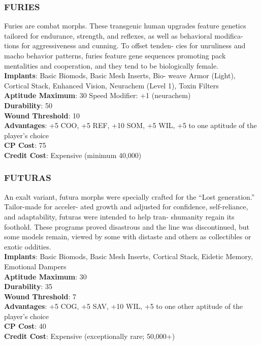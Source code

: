 \subsubsection{FURIES}
Furies are combat morphs. These transgenic human
upgrades feature genetics tailored for endurance,
strength, and reflexes, as well as behavioral modifica-
tions for aggressiveness and cunning. To offset tenden-
cies for unruliness and macho behavior patterns, furies
feature gene sequences promoting pack mentalities and
cooperation, and they tend to be biologically female.
\\ \textbf{Implants}: Basic Biomods, Basic Mesh Inserts, Bio-
weave Armor (Light), Cortical Stack, Enhanced
Vision, Neurachem (Level 1), Toxin Filters
\\ \textbf{Aptitude Maximum}: 30
Speed Modifier: +1 (neurachem)
\\ \textbf{Durability}: 50
\\ \textbf{Wound Threshold}: 10
\\ \textbf{Advantages}: +5 COO, +5 REF, +10 SOM, +5 WIL, +5
to one aptitude of the player’s choice
\\ \textbf{CP Cost}: 75
\\ \textbf{Credit Cost}: Expensive (minimum 40,000)

\subsubsection{FUTURAS}
An exalt variant, futura morphs were specially crafted
for the “Lost generation.” Tailor-made for acceler-
ated growth and adjusted for confidence, self-reliance,
and adaptability, futuras were intended to help tran-
shumanity regain its foothold. These programs proved
disastrous and the line was discontinued, but some
models remain, viewed by some with distaste and
others as collectibles or exotic oddities.
\\ \textbf{Implants}: Basic Biomods, Basic Mesh Inserts, Cortical
Stack, Eidetic Memory, Emotional Dampers
\\ \textbf{Aptitude Maximum}: 30
\\ \textbf{Durability}: 35
\\ \textbf{Wound Threshold}: 7
\\ \textbf{Advantages}: +5 COG, +5 SAV, +10 WIL, +5 to one
other aptitude of the player’s choice
\\ \textbf{CP Cost}: 40
\\ \textbf{Credit Cost}: Expensive (exceptionally rare; 50,000+)

